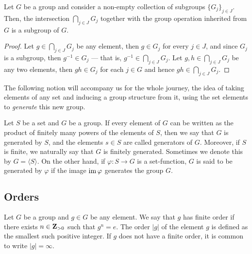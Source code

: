 \begin{corollary}
\label{cor:intersection-subgroups}
Let \(G\) be a group and consider a non-empty collection of subgroups
\(\{G_{j}\}_{j \in J}\). Then, the intersection \(\bigcap_{j \in J} G_j\) together with
the group operation inherited from \(G\) is a subgroup of \(G\).
\end{corollary}

\begin{proof}
Let \(g \in \bigcap_{j \in J} G_j\) be any element, then \(g \in G_j\) for every
\(j \in J\), and since \(G_j\) is a subgroup, then \(g^{-1} \in G_j\) --- that
is, \(g^{-1} \in \bigcap_{j \in J} G_j\). Let \(g, h \in \bigcap_{j \in J} G_j\) be
any two elements, then \(gh \in G_j\) for each \(j \in G\) and hence \(g h \in
\bigcap_{j \in J} G_j\).
\end{proof}

The following notion will accompany us for the whole journey, the idea of taking
elements of any set and inducing a group structure from it, using the set
elements to \emph{generate} this new group.


\begin{definition}
\label{def:group-generated}
Let \(S\) be a set and \(G\) be a group. If every element of \(G\) can be
written as the product of finitely many powers of the elements of \(S\), then we
say that \(G\) is generated by \(S\), and the elements \(s \in S\) are called
generators of \(G\). Moreover, if \(S\) is finite, we naturally say that \(G\)
is finitely generated. Sometimes we denote this by \(G = \langle S \rangle\).
On the other hand, if \(\varphi: S \to G\) is a set-function, \(G\) is said to
be generated by \(\varphi\) if the image \(\operatorname{im} \varphi\) generates the group
\(G\).
\end{definition}

\subsection{Orders}

\begin{definition}\label{def: group elem order}
Let \(G\) be a group and \(g \in G\) be any element. We say that \(g\) has
finite order if there exists \(n \in \mathbf{Z}_{> 0}\) such that \(g^n = e\).
The order \(|g|\) of the element \(g\) is defined as the smallest such
positive integer. If \(g\) does not have a finite order, it is common to write
  \(|g| = \infty\).
\end{definition}

